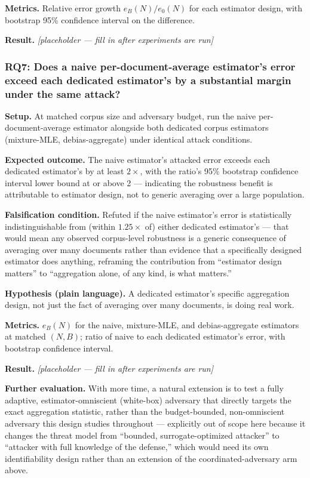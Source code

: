 \documentclass[11pt]{article}
\newcommand{\ph}{\textit{[placeholder --- fill in after experiments are run]}}
\begin{document}
\textbf{Metrics.} Relative error growth $e_B(N)/e_0(N)$ for each estimator design, with bootstrap 95\% confidence interval on the difference.

\textbf{Result.} \ph

\subsubsection{RQ7: Does a naive per-document-average estimator's error exceed each dedicated estimator's by a substantial margin under the same attack?}
\textbf{Setup.} At matched corpus size and adversary budget, run the naive per-document-average estimator alongside both dedicated corpus estimators (mixture-MLE, debias-aggregate) under identical attack conditions.

\textbf{Expected outcome.} The naive estimator's attacked error exceeds each dedicated estimator's by at least $2\times$, with the ratio's 95\% bootstrap confidence interval lower bound at or above 2 --- indicating the robustness benefit is attributable to estimator design, not to generic averaging over a large population.

\textbf{Falsification condition.} Refuted if the naive estimator's error is statistically indistinguishable from (within $1.25\times$ of) either dedicated estimator's --- that would mean any observed corpus-level robustness is a generic consequence of averaging over many documents rather than evidence that a specifically designed estimator does anything, reframing the contribution from ``estimator design matters'' to ``aggregation alone, of any kind, is what matters.''

\textbf{Hypothesis (plain language).} A dedicated estimator's specific aggregation design, not just the fact of averaging over many documents, is doing real work.

\textbf{Metrics.} $e_B(N)$ for the naive, mixture-MLE, and debias-aggregate estimators at matched $(N, B)$; ratio of naive to each dedicated estimator's error, with bootstrap confidence interval.

\textbf{Result.} \ph

\vspace{0.5em}
\noindent\textbf{Further evaluation.} With more time, a natural extension is to test a fully adaptive, estimator-omniscient (white-box) adversary that directly targets the exact aggregation statistic, rather than the budget-bounded, non-omniscient adversary this design studies throughout --- explicitly out of scope here because it changes the threat model from ``bounded, surrogate-optimized attacker'' to ``attacker with full knowledge of the defense,'' which would need its own identifiability design rather than an extension of the coordinated-adversary arm above.
\end{document}
